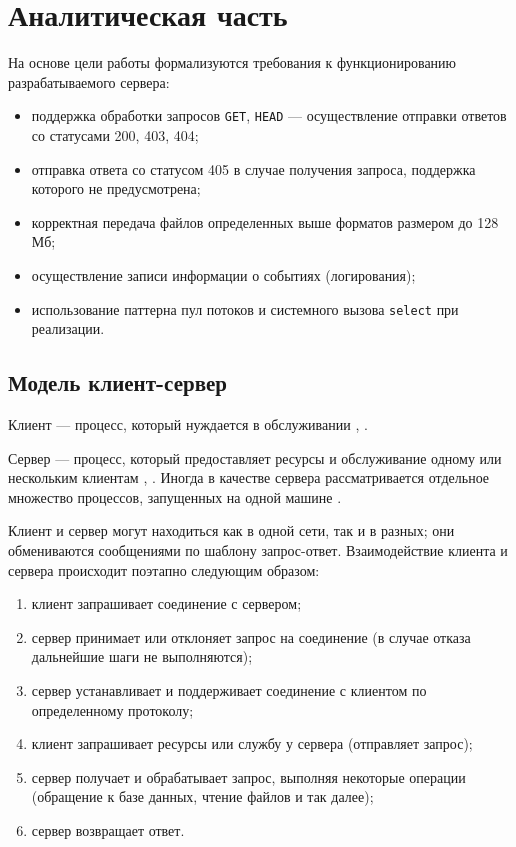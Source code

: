 \section{Аналитическая часть}

На основе цели работы формализуются требования к функционированию разрабатываемого сервера:
\begin{itemize}
	\item поддержка обработки запросов \texttt{GET}, \texttt{HEAD} --- осуществление отправки ответов со статусами 200, 403, 404;
	\item отправка ответа со статусом 405 в случае получения запроса, поддержка которого не предусмотрена;
	\item корректная передача файлов определенных выше форматов размером до 128 Мб;
	\item осуществление записи информации о событиях (логирования);
	\item использование паттерна пул потоков и системного вызова \texttt{select} при реализации.
\end{itemize}

\subsection{Модель клиент-сервер}

Клиент --- процесс, который нуждается в обслуживании \cite{kumar2019review}, \cite{oluwatosin2014client}.

Сервер --- процесс, который предоставляет ресурсы и обслуживание одному или нескольким клиентам \cite{kumar2019review}, \cite{oluwatosin2014client}.
Иногда в качестве сервера рассматривается отдельное множество процессов, запущенных на одной машине \cite{huhta2021multi}.

Клиент и сервер могут находиться как в одной сети, так и в разных; они обмениваются сообщениями по шаблону запрос-ответ.
Взаимодействие клиента и сервера происходит поэтапно следующим образом:
\begin{enumerate}
	\item клиент запрашивает соединение с сервером;
	\item сервер принимает или отклоняет запрос на соединение (в случае отказа дальнейшие шаги не выполняются);
	\item сервер устанавливает и поддерживает соединение с клиентом по определенному протоколу;
	\item клиент запрашивает ресурсы или службу у сервера (отправляет запрос);
	\item сервер получает и обрабатывает запрос, выполняя некоторые операции (обращение к базе данных, чтение файлов и так далее);
	\item сервер возвращает ответ.
\end{enumerate}

